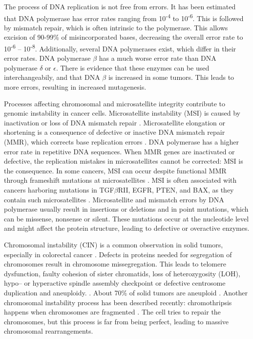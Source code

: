     The process
    of DNA replication is not free from errors. It has been estimated that DNA
    polymerase has error rates ranging from 10\textsuperscript{-4} to
    10\textsuperscript{-6}. This is followed by mismatch repair, which is often
    intrinsic to the polymerase. This allows
    excision of 90-99\% of misincorporated bases, decreasing the overall error
    rate to 10\textsuperscript{-6} -- 10\textsuperscript{-8}. Additionally,
    several DNA polymerases exist, which differ in their error rates. DNA
    polymerase $\beta$ has a much worse error rate than DNA polymerase $\delta$
    or $\epsilon$. There is evidence that these enzymes can be used
    interchangeabily, and that DNA $\beta$ is increased in some tumors. This
    leads to more errors, resulting in increased mutagenesis.

    Processes affecting chromosomal and microsatellite integrity contribute to genomic instability in cancer cells. Microsatellite
    instability (MSI) is caused by inactivation or loss of DNA mismatch repair
    {\cite{msi}}. Microsatellite elongation or shortening is a consequence of
    defective or inactive DNA mismatch repair (MMR), which corrects base
    replication errors {\cite{cin_crc}}. DNA polymerase has a higher error rate
    in repetitive DNA sequences. When MMR genes are inactivated or defective,
    the replication mistakes in microsatellites cannot be corrected: MSI is the
    consequence. In some cancers, MSI can occur despite functional MMR through
    frameshift mutations at microsatellites {\cite{cin_crc}}. MSI is often
    associated with cancers harboring mutations in TGF$\beta$RII, EGFR, PTEN,
    and BAX, as they contain such microsatellites {\cite{micro}}. Microsatellite
    and mismatch errors by DNA polymerase usually result in insertions or
    deletions and in point mutations, which can be missense, nonsense or silent.
    These mutations occur at the nucleotide level and might affect the protein
    structure, leading to defective or overactive enzymes.

    Chromosomal instability (CIN) is a common observation in solid
    tumors, especially in colorectal cancer {\cite{cin_crc}}. Defects in
    proteins needed for segregation of chromosomes result in chromosome
    missegregation. This leads to telomere dysfunction, faulty cohesion of sister chromatids, loss of heterozygosity (LOH), hypo-- or hyperactive spindle
    assembly checkpoint or defective centrosome duplication and aneuploidy.
    {\cite{cin_crc}}. About 70\% of solid tumors are aneuploid
    {\cite{aneuploidy}}. Another chromosomal instability process has been
    described recently: chromothripsis happens when chromosomes are fragmented
    {\cite{chromothripsis_1}} {\cite{chromothripsis_2}}
    {\cite{chromothripsis_2}}. The cell tries to repair the chromosomes, but
    this process is far from being perfect, leading to massive chromosomal
    rearrangements.

